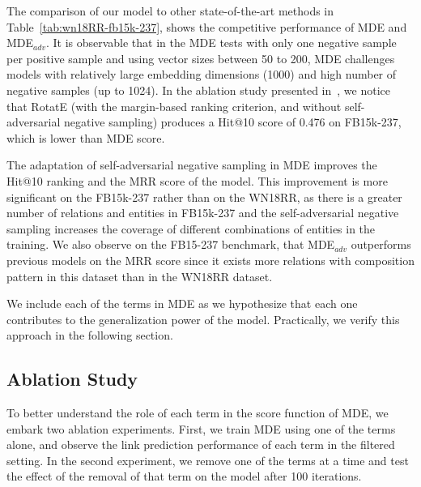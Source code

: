 \documentclass{ecai}
\begin{document}
The comparison of our model to other state-of-the-art methods in Table~\ref{tab:wn18RR-fb15k-237}, shows the competitive performance of MDE and MDE$_{adv}$.
It is observable that in the MDE tests with only one negative sample per positive sample and using vector sizes between 50 to 200, MDE challenges models with relatively large embedding dimensions (1000) and high number of negative samples (up to 1024). In the ablation study presented in~\cite{sun2019rotate}, we notice that RotatE (with the margin-based ranking criterion, and without self-adversarial negative sampling) produces a Hit@10 score of 0.476 on FB15k-237, which is lower than MDE score.

The adaptation of self-adversarial negative sampling in MDE improves the Hit@10 ranking and the MRR score of the model. This improvement is more significant on the FB15k-237 rather than on the WN18RR, as there is a greater number of relations and entities in FB15k-237 and the self-adversarial negative sampling increases the coverage of different combinations of entities in the training.
We also observe on the FB15-237 benchmark, that MDE$_{adv}$ outperforms previous models on the MRR score since it exists more relations with composition pattern in this dataset than in the WN18RR dataset.















We include each of the terms in MDE as we hypothesize that each one contributes to the generalization power of the model. Practically, we verify this approach in the following section.




\subsection{Ablation Study}
To better understand the role of each term in the score function of MDE, we embark two ablation experiments. First, we train MDE using one of the terms alone, and observe the link prediction performance of each term in the filtered setting. In the second experiment, we remove one of the terms at a time and test the effect of the removal of that term on the model after 100 iterations.
\end{document}
